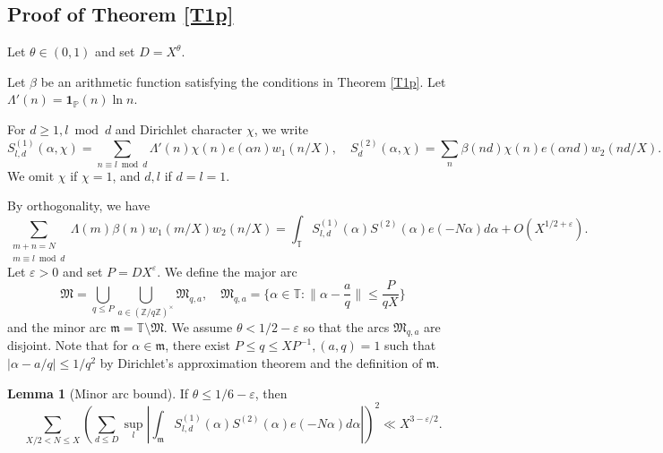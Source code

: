 \documentclass{amsart}
\theoremstyle{definition}
\newtheorem{lem}[dfn]{Lemma}
\theoremstyle{remark}
\newcommand{\1}{
    \bm{1}
}
\newcommand{\pZ}[1]{
(\mathbb{Z}/{ #1 \mathbb{Z}})^{\times}
}
\begin{document}
\subsection{Proof of Theorem \ref{T1p}}



Let $\theta \in (0,1)$ and set $D=X^{\theta}$. 

Let $\beta$ be an arithmetic function satisfying the conditions in Theorem \ref{T1p}. Let $\Lambda'(n)=\1_{\mathbb{P}}(n) \ln{n}$. 


For $d \geq 1, l \bmod d$ and Dirichlet character $\chi$, we write
\[ S^{(1)}_{l,d}(\alpha,\chi) = \sum_{n \equiv l \bmod d} \Lambda'(n) \chi(n) e(\alpha n) w_1(n/X), \quad S^{(2)}_{d}(\alpha,\chi) = \sum_{n} \beta(nd) \chi(n) e(\alpha nd) w_2(nd/X). \]
We omit $\chi$ if $\chi=1$, and $d,l$ if $d=l=1$. 







By orthogonality, we have
\begin{equation} \sum_{\substack{m+n=N \\ m \equiv l \bmod d}} \Lambda(m) \beta(n) w_1(m/X) w_2(n/X) = \int_{\mathbb{T}} S^{(1)}_{l,d}(\alpha) S^{(2)}(\alpha) e(-N\alpha) d\alpha + O(X^{1/2+\varepsilon} ). \label{Morth} \end{equation}
Let $\varepsilon>0$ and set $P=DX^{\varepsilon}$. We define the major arc
\[ \mathfrak{M} = \bigcup_{q \leq P} \bigcup_{a \in \pZ{q}} \mathfrak{M}_{q,a}, \quad \mathfrak{M}_{q,a} = \{ \alpha \in \mathbb{T} : \| \alpha - \frac{a}{q} \| \leq \frac{P}{qX} \} \]
and the minor arc $\mathfrak{m} = \mathbb{T} \setminus \mathfrak{M}$. 
We assume $\theta < 1/2-\varepsilon$ so that the arcs $\mathfrak{M}_{q,a}$ are disjoint. 
Note that for $\alpha \in \mathfrak{m}$, there exist $P \leq q \leq XP^{-1}, (a,q)=1$ such that $|\alpha-a/q| \leq 1/q^2$ by Dirichlet's approximation theorem and the definition of $\mathfrak{m}$. 






\begin{lem}[Minor arc bound]\label{Min}
If $\theta \leq 1/6-\varepsilon$, then
\begin{equation}
\sum_{X/2 < N \leq X} \left( \sum_{d \leq D} \sup_{l} \left| \int_{\mathfrak{m}} S^{(1)}_{l,d}(\alpha) S^{(2)}(\alpha) e(-N\alpha) d\alpha \right| \right)^2 \ll X^{3-\varepsilon/2}. \label{mb}
\end{equation}
\end{lem}
\end{document}
